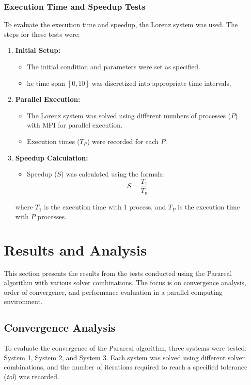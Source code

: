 \documentclass[a4paper,12pt,french]{article}
\begin{document}
\subsubsection{Execution Time and Speedup Tests}
To evaluate the execution time and speedup, the Lorenz system was used.
The steps for these tests were:
\begin{enumerate}
    \item \textbf{Initial Setup:}
        \begin{itemize}
            \item The initial condition and parameters were set as specified.
            \item he time span $[0,10]$ was discretized into appropriate time intervals.
        \end{itemize}
    \item \textbf{Parallel Execution:}
        \begin{itemize}
            \item The Lorenz system was solved using different numbers of processes ($P$) with MPI for parallel execution.
            \item Execution times ($T_P$) were recorded for each $P$.
        \end{itemize}
    \item \textbf{Speedup Calculation:}
        \begin{itemize}
            \item Speedup ($S$) was calculated using the formula:
                \begin{equation}
                    S = \frac{T_1}{T_p}
                \end{equation}
        \end{itemize}
        where $T_1$ is the execution time with 1 process, and $T_P$ is the execution time with $P$ processes.
\end{enumerate}

\section{Results and Analysis}
This section presents the results from the tests conducted using the Parareal algorithm with various solver combinations. The focus is on convergence analysis, order of convergence, and performance evaluation in a parallel computing environment.

\subsection{Convergence Analysis}
To evaluate the convergence of the Parareal algorithm, three systems were tested: System 1, System 2, and System 3. Each system was solved using different solver combinations, and the number of iterations required to reach a specified tolerance (\textit{tol}) was recorded.
\end{document}
